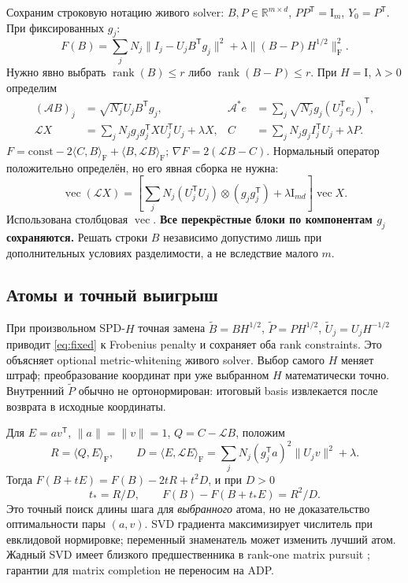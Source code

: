 \documentclass[11pt,a4paper]{article}
\newcommand{\R}{\mathbb R}
\newcommand{\Id}{\mathrm I}
\newcommand{\T}{^{\mathsf T}}
\newcommand{\F}{_{\mathrm F}}
\newcommand{\ip}[2]{\langle #1,#2\rangle_{\mathrm F}}
\DeclareMathOperator{\rank}{rank}
\begin{document}
Сохраним строковую нотацию живого solver: $B,P\in\R^{m\times d}$,
$PP\T=\Id_m$, $Y_0=P\T$. При фиксированных $g_j$:
\begin{equation}\label{eq:fixed}
 F(B)=\sum_jN_j\|I_j-U_jB\T g_j\|^2+
                      \lambda\|(B-P)H^{1/2}\|\F^2.
\end{equation}
Нужно явно выбрать $\rank(B)\le r$ либо $\rank(B-P)\le r$.
При $H=\Id$, $\lambda>0$ определим
\begin{align}
 (\mathcal AB)_j&=\sqrt{N_j}U_jB\T g_j,&
 \mathcal A^*e&=\sum_j\sqrt{N_j}g_j(U_j\T e_j)\T,\label{eq:operator}\\
 \mathcal L X&=\sum_jN_jg_jg_j\T XU_j\T U_j+\lambda X,&
 C&=\sum_jN_jg_j I_j\T U_j+\lambda P.\label{eq:hessian}
\end{align}
$F=\mathrm{const}-2\ip{C}{B}+\ip{B}{\mathcal LB}$;
$\nabla F=2(\mathcal LB-C)$.
Нормальный оператор положительно определён, но его явная сборка не нужна:
\[
 \operatorname{vec}(\mathcal LX)=
 \left[\sum_jN_j(U_j\T U_j)\otimes(g_jg_j\T)+\lambda\Id_{md}\right]
 \operatorname{vec}X.
\]
Использована столбцовая $\operatorname{vec}$.
\textbf{Все перекрёстные блоки по компонентам $g_j$ сохраняются.}
Решать строки $B$ независимо допустимо лишь при дополнительных условиях
разделимости, а не вследствие малого $m$.

\subsection{Атомы и точный выигрыш}
При произвольном SPD-$H$ точная замена
$\widetilde B=BH^{1/2}$, $\widetilde P=PH^{1/2}$,
$\widetilde U_j=U_jH^{-1/2}$ приводит \eqref{eq:fixed} к Frobenius penalty
и сохраняет оба rank constraints. Это объясняет optional metric-whitening
живого solver. Выбор самого $H$ меняет штраф; преобразование координат
при уже выбранном $H$ математически точно. Внутренний
$\widetilde P$ обычно не ортонормирован: итоговый basis извлекается
после возврата в исходные координаты.

Для $E=av\T$, $\|a\|=\|v\|=1$, $Q=C-\mathcal LB$, положим
\begin{equation}\label{eq:gain}
 R=\ip{Q}{E},\qquad
 D=\ip{E}{\mathcal LE}
   =\sum_jN_j(g_j\T a)^2\|U_jv\|^2+\lambda.
\end{equation}
Тогда $F(B+tE)=F(B)-2tR+t^2D$, и при $D>0$
\begin{equation}\label{eq:step}
 t_*=R/D,\qquad F(B)-F(B+t_*E)=R^2/D.
\end{equation}
Это точный поиск длины шага для \emph{выбранного} атома, но не доказательство
оптимальности пары $(a,v)$. SVD градиента максимизирует числитель при
евклидовой нормировке; переменный знаменатель может изменить лучший атом.
Жадный SVD имеет близкого предшественника в rank-one matrix pursuit
\cite{pursuit}; гарантии для matrix completion не переносим на ADP.
\end{document}

